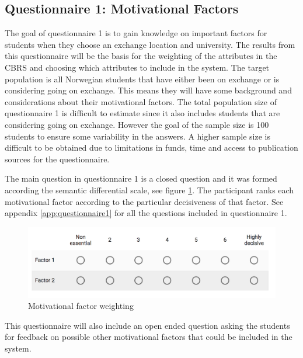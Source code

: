 \subsection{Questionnaire 1: Motivational Factors}\label{sec:questionnaire_1}

The goal of questionnaire 1 is to gain knowledge on important factors for students when they choose an exchange location and university. The results from this questionnaire will be the basis for the weighting of the attributes in the CBRS and choosing which attributes to include in the system. The target population is all Norwegian students that have either been on exchange or is considering going on exchange. This means they will have some background and considerations about their motivational factors. The total population size of questionnaire 1 is difficult to estimate since it also includes students that are considering going on exchange. However the goal of the sample size is 100 students to ensure some variability in the answers. A higher sample size is difficult to be obtained due to limitations in funds, time and access to publication sources for the questionnaire. 


The main question in questionnaire 1 is a closed question and it was formed according the semantic differential scale, see figure \ref{fig:semantic_scale}. The participant ranks each motivational factor according to the particular decisiveness of that factor. See appendix \ref{app:questionnaire1} for all the questions included in questionnaire 1. 

\begin{figure}[h!]
    \centering
    \includegraphics[width=1\textwidth]{fig/question1.png}
    \caption{Motivational factor weighting}
    \label{fig:semantic_scale}
\end{figure}

This questionnaire will also include an open ended question asking the students for feedback on possible other motivational factors that could be included in the system.

